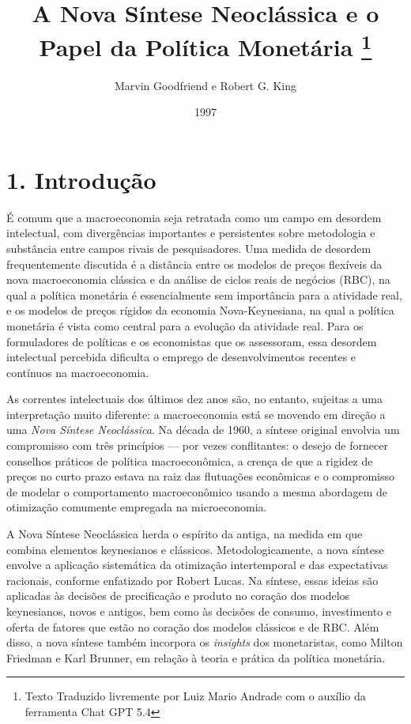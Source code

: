 \documentclass[12pt]{article}
\title{A Nova Síntese Neoclássica e o Papel da Política Monetária \thanks{Texto Traduzido livremente por Luiz Mario Andrade com o auxílio da ferramenta Chat GPT 5.4}}
\author{Marvin Goodfriend e Robert G. King}
\date{1997}
\begin{document}
\maketitle

\section{1. Introdução}

É comum que a macroeconomia seja retratada como um campo em desordem intelectual, com divergências importantes e persistentes sobre metodologia e substância entre campos rivais de pesquisadores. Uma medida de desordem frequentemente discutida é a distância entre os modelos de preços flexíveis da nova macroeconomia clássica e da análise de ciclos reais de negócios (RBC), na qual a política monetária é essencialmente sem importância para a atividade real, e os modelos de preços rígidos da economia Nova-Keynesiana, na qual a política monetária é vista como central para a evolução da atividade real. Para os formuladores de políticas e os economistas que os assessoram, essa desordem intelectual percebida dificulta o emprego de desenvolvimentos recentes e contínuos na macroeconomia.

As correntes intelectuais dos últimos dez anos são, no entanto, sujeitas a uma interpretação muito diferente: a macroeconomia está se movendo em direção a uma \textit{Nova Síntese Neoclássica}. Na década de 1960, a síntese original envolvia um compromisso com três princípios — por vezes conflitantes: o desejo de fornecer conselhos práticos de política macroeconômica, a crença de que a rigidez de preços no curto prazo estava na raiz das flutuações econômicas e o compromisso de modelar o comportamento macroeconômico usando a mesma abordagem de otimização comumente empregada na microeconomia.

A Nova Síntese Neoclássica herda o espírito da antiga, na medida em que combina elementos keynesianos e clássicos. Metodologicamente, a nova síntese envolve a aplicação sistemática da otimização intertemporal e das expectativas racionais, conforme enfatizado por Robert Lucas. Na síntese, essas ideias são aplicadas às decisões de precificação e produto no coração dos modelos keynesianos, novos e antigos, bem como às decisões de consumo, investimento e oferta de fatores que estão no coração dos modelos clássicos e de RBC. Além disso, a nova síntese também incorpora os \textit{insights} dos monetaristas, como Milton Friedman e Karl Brunner, em relação à teoria e prática da política monetária.
\end{document}
